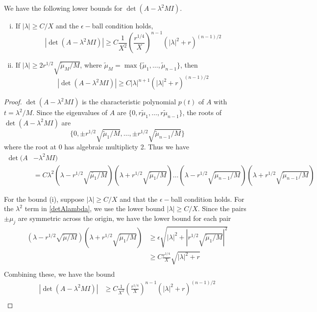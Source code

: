 \documentclass[thesis.tex]{subfiles}
\begin{document}
\begin{lemma}\label{detAboundlemma}
We have the following lower bounds for $\det(A - \lambda^2 M I)$.
\begin{enumerate}[(i)]
\item If $|\lambda| \geq C/X$ and the $\epsilon-$ball condition holds,
\begin{equation}\label{detAbound1}
|\det(A - \lambda^2 M I)|
\geq C \frac{1}{X^2} \left( \frac{r^{1/4}}{X} \right)^{n-1} \left( |\lambda|^2 + r \right)^{(n-1)/2}
\end{equation}

\item If $|\lambda| \geq 2 r^{1/2} \sqrt{\tilde{\mu}_M/M}$, where $\tilde{\mu}_M = \max\{\tilde{\mu}_1, \dots, \tilde{\mu}_{n-1} \}$, then
\begin{equation}\label{detAbound2}
|\det(A - \lambda^2 M I)|
\geq C |\lambda|^{n+1} \left( |\lambda|^2 + r \right)^{(n-1)/2}
\end{equation}

\end{enumerate}
\begin{proof}
$\det(A - \lambda^2 MI)$ is the characteristic polynomial $p(t)$ of $A$ with $t = \lambda^2 / M$. Since the eigenvalues of $A$ are $\{0, r \tilde{\mu}_1, \dots, r\tilde{\mu}_{n-1}\}$, the roots of $\det(A - \lambda^2 MI)$ are 
\[
\{0, \pm r^{1/2} \sqrt{\tilde{\mu}_1/M}, \dots, \pm r^{1/2} \sqrt{\tilde{\mu}_{n-1}/M}\}
\]
where the root at 0 has algebraic multiplicty 2. Thus we have
\begin{align}\label{detAlambda}
\det(A &- \lambda^2 M I) \\ 
&= C \lambda^2 (\lambda - r^{1/2} \sqrt{\tilde{\mu_1}/M} )(\lambda + r^{1/2} \sqrt{\tilde{\mu}_1/M} )
\dots(\lambda - r^{1/2} \sqrt{\tilde{\mu}_{n-1}/M})(\lambda + r^{1/2} \sqrt{\tilde{\mu}_{n-1}/M} ) \nonumber
\end{align}

For the bound (i), suppose $|\lambda| \geq C/X$ and that the $\epsilon-$ball condition holds. For the $\lambda^2$ term in \eqref{detAlambda}, we use the lower bound $|\lambda| \geq C/X$. Since the pairs $\pm \mu_j$ are symmetric across the origin, we have the lower bound for each pair
\begin{align*}
(\lambda - r^{1/2} \sqrt{\tilde{\mu}/M} )(\lambda + r^{1/2} \sqrt{\tilde{\mu}_1/M} )
&\geq \epsilon \sqrt{ |\lambda|^2 + |r^{1/2} \sqrt{\tilde{\mu}_1/M}|^2 } \\
&\geq C \frac{r^{1/4}}{X} \sqrt{ |\lambda|^2 + r } \\
\end{align*}
Combining these, we have the bound
\begin{align*}
|\det(A - \lambda^2 M I)|
&\geq C \frac{1}{X^2} \left( \frac{r^{1/4}}{X} \right)^{n-1} \left( |\lambda|^2 + r \right)^{(n-1)/2} \\
\end{align*}


\end{proof}
\end{lemma}
\end{document}
